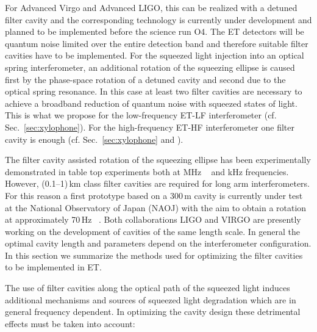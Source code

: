 %
For Advanced Virgo and Advanced LIGO, this can be realized with a detuned filter cavity and the corresponding technology is currently under development and planned to be implemented before the science run O4.  
%
The ET detectors will be quantum noise limited over the entire detection band and therefore suitable filter cavities have to be implemented. For the squeezed light injection into an optical spring interferometer, an additional rotation of the squeezing ellipse is caused first by the phase-space rotation of a detuned cavity and second due to the optical spring resonance. In this case at least two filter cavities are necessary to achieve a broadband reduction of quantum noise with squeezed states of light. This is what we propose for the low-frequency ET-LF interferometer (cf. Sec.~\ref{sec:xylophone}). For the high-frequency ET-HF interferometer one filter cavity is enough (cf. Sec.~\ref{sec:xylophone} and \cite{Hild2010b}).

The filter cavity assisted rotation of the squeezing ellipse has been experimentally demonstrated
in table top experiments both at MHz ~\cite{Chelkowski2005} and kHz \cite{Oelker2016} frequencies. However,
(0.1--1)\,km class filter cavities are required for long arm interferometers. For this reason a first prototype based on a 300\,m cavity is currently under test at the National Observatory of Japan (NAOJ) with the aim to obtain a rotation at approximately 70\,Hz ~\cite{Capocasa2019}.
Both collaborations LIGO \cite{McCuller2019} and VIRGO \cite{Degallaix2019} are presently working on the development of cavities of the same length scale. In general the optimal cavity length and parameters depend on the interferometer configuration. In this section we summarize the methods used for optimizing the filter cavities to be implemented in ET.

The use of filter cavities along the optical path of the squeezed light induces additional mechanisms and sources of squeezed light degradation which are in general frequency dependent. In optimizing the cavity design these detrimental effects must be taken into account: 

